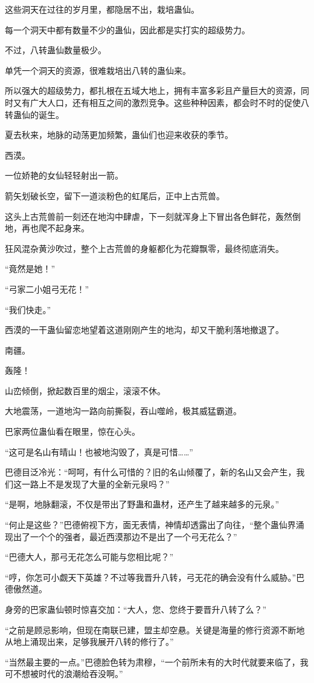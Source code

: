 \begin{this_body}
这些洞天在过往的岁月里，都隐居不出，栽培蛊仙。

每一个洞天中都有数量不少的蛊仙，因此都是实打实的超级势力。

不过，八转蛊仙数量极少。

单凭一个洞天的资源，很难栽培出八转的蛊仙来。

所以强大的超级势力，都扎根在五域大地上，拥有丰富多彩且产量巨大的资源，同时又有广大人口，还有相互之间的激烈竞争。这些种种因素，都会时不时的促使八转蛊仙的诞生。

夏去秋来，地脉的动荡更加频繁，蛊仙们也迎来收获的季节。

西漠。

一位娇艳的女仙轻轻射出一箭。

箭矢划破长空，留下一道淡粉色的虹尾后，正中上古荒兽。

这头上古荒兽前一刻还在地沟中肆虐，下一刻就浑身上下冒出各色鲜花，轰然倒地，再也爬不起身来。

狂风混杂黄沙吹过，整个上古荒兽的身躯都化为花瓣飘零，最终彻底消失。

“竟然是她！”

“弓家二小姐弓无花！”

“我们快走。”

西漠的一干蛊仙留恋地望着这道刚刚产生的地沟，却又干脆利落地撤退了。

南疆。

轰隆！

山峦倾倒，掀起数百里的烟尘，滚滚不休。

大地震荡，一道地沟一路向前撕裂，吞山噬岭，极其威猛霸道。

巴家两位蛊仙看在眼里，惊在心头。

“这可是名山有晴山！也被地沟毁了，真是可惜……”

巴德目泛冷光：“呵呵，有什么可惜的？旧的名山倾覆了，新的名山又会产生，我们这一路上不是发现了大量的全新元泉吗？”

“是啊，地脉翻滚，不仅是带出了野蛊和蛊材，还产生了越来越多的元泉。”

“何止是这些？”巴德俯视下方，面无表情，神情却透露出了向往，“整个蛊仙界涌现出了一个个的强者，最近西漠那边不是出了一个弓无花么？”

“巴德大人，那弓无花怎么可能与您相比呢？”

“哼，你怎可小觑天下英雄？不过等我晋升八转，弓无花的确会没有什么威胁。”巴德傲然道。

身旁的巴家蛊仙顿时惊喜交加：“大人，您、您终于要晋升八转了么？”

“之前是顾忌影响，但现在南联已建，盟主却空悬。关键是海量的修行资源不断地从地上涌现出来，足够我展开八转的修行了。”

“当然最主要的一点。”巴德脸色转为肃穆，“一个前所未有的大时代就要来临了，我可不想被时代的浪潮给吞没啊。”

\end{this_body}

